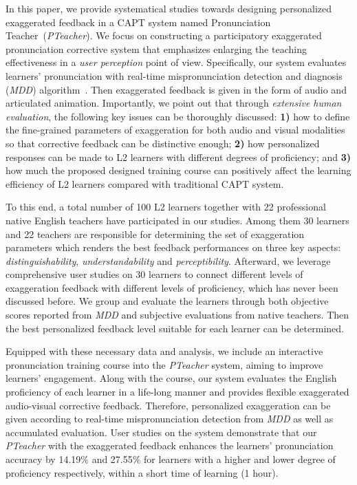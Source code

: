\documentclass[sigconf]{acmart}
\begin{document}
In this paper, we provide systematical studies towards designing personalized exaggerated feedback in a CAPT system named Pronunciation Teacher~(\textit{PTeacher}). We focus on constructing a participatory exaggerated pronunciation corrective system that emphasizes enlarging the teaching effectiveness in a \textit{user perception} point of view. Specifically, our system evaluates learners' pronunciation with real-time mispronunciation detection and diagnosis (\textit{MDD}) algorithm~\cite{li2016mispronunciation}. Then exaggerated feedback is given in the form of audio and articulated animation. Importantly, we point out that through \textit{extensive human evaluation}, the following key issues can be thoroughly discussed: \textbf{1)} how to define the fine-grained parameters of exaggeration for both audio and visual modalities so that corrective feedback can be distinctive enough; \textbf{2)} how 
personalized responses can be made to L2 learners with different degrees of proficiency; and \textbf{3)} how much the proposed designed training course can positively affect the learning efficiency of L2 learners compared with traditional CAPT system.


To this end, a total number of 100 L2 learners together with 22 professional native English teachers have participated in our studies.
%
Among them 30 learners and 22 teachers are responsible for determining the set of exaggeration parameters which renders the best feedback performances on three key aspects: \textit{distinguishability}, \textit{understandability} and \textit{perceptibility}. 
%
Afterward, we leverage comprehensive user studies on 30 learners to connect different levels of exaggeration feedback with different levels of proficiency, which has never been discussed before.
We group and evaluate the learners through both objective scores reported from \textit{MDD} and subjective evaluations from native teachers. 
Then the best personalized feedback level suitable for each learner can be determined. 


Equipped with these necessary data and analysis, we include an interactive pronunciation training course into the \textit{PTeacher} system, aiming to improve learners' engagement. Along with the course, our system evaluates the English proficiency of each learner in a life-long manner and provides flexible exaggerated audio-visual corrective feedback. Therefore, personalized exaggeration can be given according to real-time mispronunciation detection from \textit{MDD} as well as accumulated evaluation. 
User studies on the system demonstrate that our \textit{PTeacher} with the exaggerated feedback enhances the learners' pronunciation accuracy by 14.19\% and 27.55\% for learners with a higher and lower degree of proficiency respectively, within a short time of learning (1 hour). 
\end{document}
